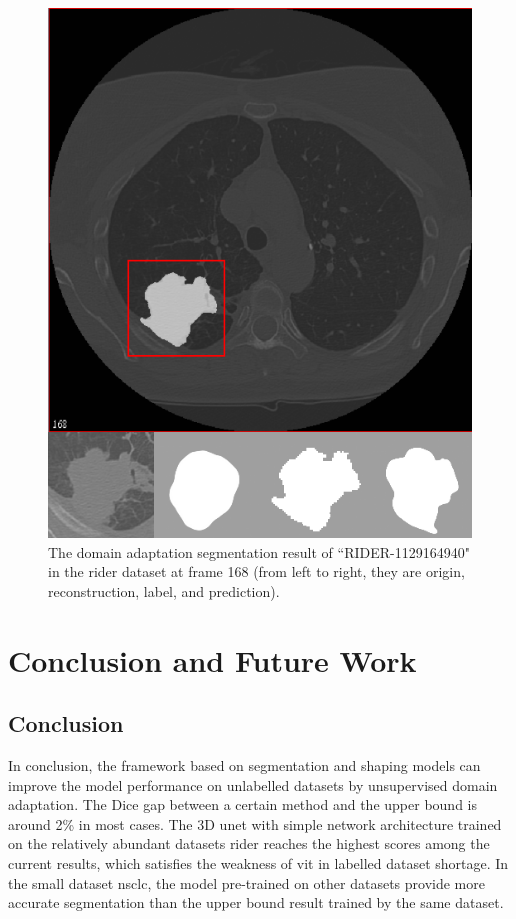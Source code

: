 \documentclass[11pt,times,oneside,openright]{eeereport}
\begin{document}
\begin{figure}[!htb]
\begin{minipage}{0.48\textwidth}
     \centering
     \includegraphics[width=.9\linewidth]{fig/result/visual_uda.png}
     \caption{The domain adaptation segmentation result of “RIDER-1129164940" in the \acrshort{rider} dataset at frame 168 (from left to right, they are origin, reconstruction, label, and prediction).
}\label{fig:visual_uda}
   \end{minipage}
\end{figure}

\chapter{Conclusion and Future Work}
\section{Conclusion}
In conclusion, the framework based on segmentation and shaping models can improve the model performance on unlabelled datasets by unsupervised domain adaptation. The Dice gap between a certain method and the upper bound is around 2\% in most cases. The 3D \acrshort{unet} with simple network architecture trained on the relatively abundant datasets \acrshort{rider} reaches the highest scores among the current results, which satisfies the weakness of \acrshort{vit} in labelled dataset shortage. In the small dataset \acrshort{nsclc}, the model pre-trained on other datasets provide more accurate segmentation than the upper bound result trained by the same dataset.
\end{document}
